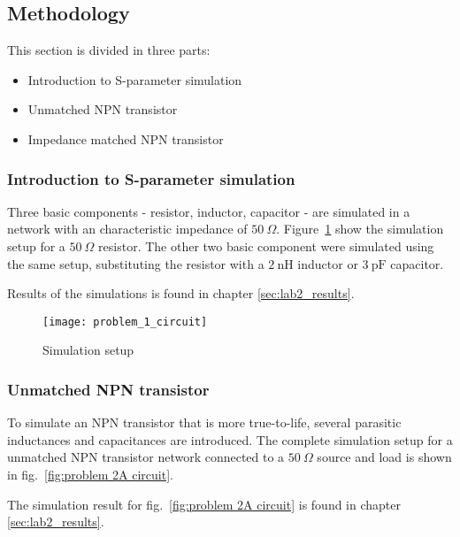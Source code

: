 \documentclass[report.tex]{subfiles}
\begin{document}
\subsection{Methodology}
\label{sec:lab2 methodology}
This section is divided in three parts:
\begin{itemize}
    \item Introduction to S-parameter simulation
    \item Unmatched NPN transistor
    \item Impedance matched NPN transistor
\end{itemize}
%
%

\subsubsection{Introduction to S-parameter simulation}
Three basic components - resistor, inductor, capacitor - are simulated in a network with an characteristic impedance of $50~\Omega$. Figure~\ref{fig:problem 1 circuit} show the simulation setup for a $50~\Omega$ resistor. The other two basic component were simulated using the same setup, substituting the resistor with a $2~\text{nH}$ inductor or $3~\text{pF}$ capacitor.

Results of the simulations is found in chapter \ref{sec:lab2_results}.

\begin{figure}[h]
    \centering
    \texttt{[image: problem\_1\_circuit]}
    \caption{Simulation setup}
    \label{fig:problem 1 circuit}
\end{figure}

\subsubsection{Unmatched NPN transistor}
To simulate an NPN transistor that is more true-to-life, several parasitic inductances and capacitances are introduced. The complete simulation setup for a unmatched NPN transistor network connected to a $50~\Omega$ source and load is shown in fig.~\ref{fig:problem 2A circuit}.

The simulation result for fig.~\ref{fig:problem 2A circuit} is found in chapter \ref{sec:lab2_results}.
\end{document}

